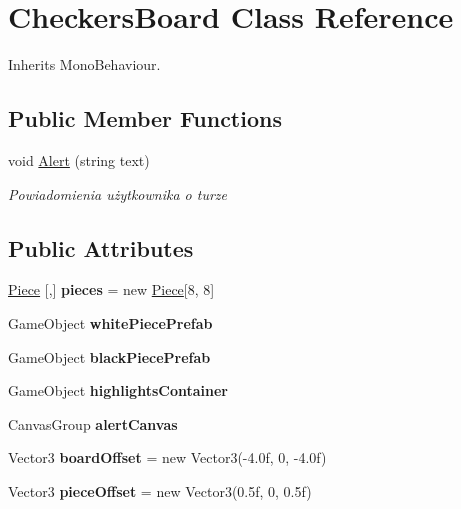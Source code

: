 \hypertarget{class_checkers_board}{}\section{Checkers\+Board Class Reference}
\label{class_checkers_board}


Inherits Mono\+Behaviour.

\subsection*{Public Member Functions}
\begin{DoxyCompactItemize}
\item 
void \mbox{\hyperlink{class_checkers_board_a43dfdbc2efbedd0e5a25bd3d6fda391e}{Alert}} (string text)
\begin{DoxyCompactList}\small\item\em Powiadomienia użytkownika o turze \end{DoxyCompactList}\end{DoxyCompactItemize}
\subsection*{Public Attributes}
\begin{DoxyCompactItemize}
\item 
\mbox{\label{class_checkers_board_a9dd97115a26f7074627eff96023efd6c}} 
\mbox{\hyperlink{class_piece}{Piece}} \mbox{[},\mbox{]} {\bfseries pieces} = new \mbox{\hyperlink{class_piece}{Piece}}\mbox{[}8, 8\mbox{]}
\item 
\mbox{\label{class_checkers_board_a6d03e27d2b07661e498a810d71011953}} 
Game\+Object {\bfseries white\+Piece\+Prefab}
\item 
\mbox{\label{class_checkers_board_a93695d6f571a4bc0e8841c12fbb8f988}} 
Game\+Object {\bfseries black\+Piece\+Prefab}
\item 
\mbox{\label{class_checkers_board_a3b8ddc756a9969bc64c2f4d3ad98b240}} 
Game\+Object {\bfseries highlights\+Container}
\item 
\mbox{\label{class_checkers_board_afe9b845e18909774b00cf2e25c86ae7f}} 
Canvas\+Group {\bfseries alert\+Canvas}
\item 
\mbox{\label{class_checkers_board_ab6f24d3618d875ad77b9dc608b3c5854}} 
Vector3 {\bfseries board\+Offset} = new Vector3(-\/4.\+0f, 0, -\/4.\+0f)
\item 
\mbox{\label{class_checkers_board_a76e7203ed686bb8f808b011636171bed}} 
Vector3 {\bfseries piece\+Offset} = new Vector3(0.\+5f, 0, 0.\+5f)
\end{DoxyCompactItemize}
